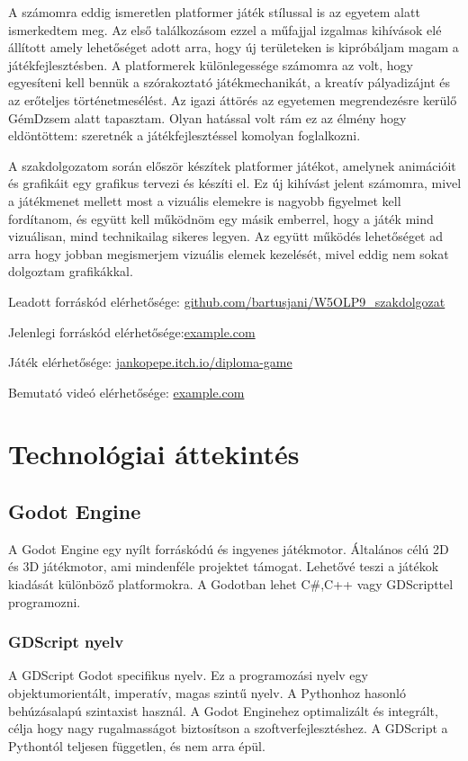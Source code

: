 \documentclass[
]{thesis-ekf}
\theoremstyle{definition}
\theoremstyle{remark}
\begin{document}
A számomra eddig ismeretlen platformer játék stílussal is az egyetem alatt ismerkedtem meg. Az első találkozásom ezzel a műfajjal izgalmas kihívások elé állított amely lehetőséget adott arra, hogy új területeken is kipróbáljam magam a játékfejlesztésben. A platformerek különlegessége számomra az volt, hogy egyesíteni kell bennük a szórakoztató játékmechanikát, a kreatív pályadizájnt és az erőteljes történetmesélést. Az igazi áttörés az egyetemen megrendezésre kerülő GémDzsem alatt tapasztam. Olyan hatással volt rám ez az élmény hogy eldöntöttem: szeretnék a játékfejlesztéssel komolyan foglalkozni.

A szakdolgozatom során először készítek platformer játékot, amelynek animációit és grafikáit  egy grafikus tervezi és készíti el. Ez új kihívást jelent számomra, mivel a játékmenet mellett most a vizuális elemekre is nagyobb figyelmet kell fordítanom, és együtt kell működnöm egy másik emberrel, hogy a játék mind vizuálisan, mind technikailag sikeres legyen. Az együtt működés lehetőséget ad arra hogy jobban megismerjem vizuális elemek kezelését, mivel eddig nem sokat dolgoztam grafikákkal.


Leadott forráskód elérhetősége:
\href{https://github.com/bartusjani/W5OLP9_szakdolgozat}{github.com/bartusjani/W5OLP9\_szakdolgozat}

Jelenlegi forráskód elérhetősége:\href{example.com}{example.com}

Játék elérhetősége: \href{https://jankopepe.itch.io/diploma-game}{jankopepe.itch.io/diploma-game}

Bemutató videó elérhetősége: \href{https://example.com}{example.com}


\chapter{Technológiai áttekintés}

\section{Godot Engine}

A Godot Engine egy nyílt forráskódú és ingyenes játékmotor. Általános célú 2D és 3D játékmotor, ami mindenféle projektet támogat. Lehetővé teszi a játékok kiadását különböző platformokra. A Godotban lehet C\#,C++ vagy GDScripttel programozni.
\subsection{GDScript nyelv}
A GDScript Godot specifikus nyelv. Ez a programozási nyelv egy objektumorientált, imperatív, magas szintű nyelv. A Pythonhoz hasonló behúzásalapú szintaxist használ. A Godot Enginehez optimalizált és integrált, célja hogy nagy rugalmasságot biztosítson a szoftverfejlesztéshez. A GDScript a Pythontól  teljesen független, és nem arra épül.
\end{document}
